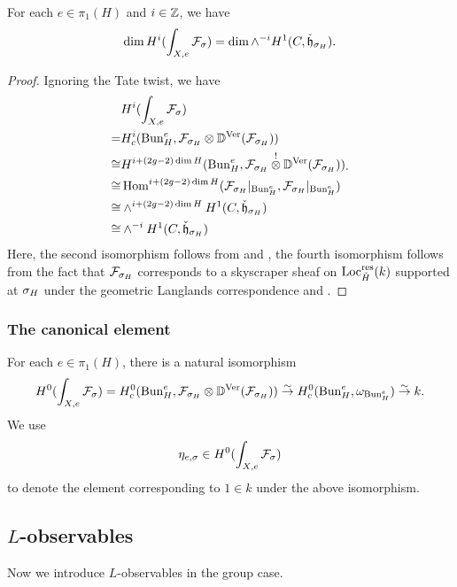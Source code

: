 \documentclass[reqno]{amsart}
\numberwithin{equation}{section}
\numberwithin{equation}{section}
\begin{document}
\begin{prop}\label{prop:dim}
    For each $e\in \pi_1(H)$ and $i\in \mathbb{Z}$, we have \[\dim H^{i}(\int_{X,e}\mathcal{F}_{\sigma})=\dim  \wedge^{-i}H^1(C,\check{\mathfrak{h}}_{\sigma_H}).\]
\end{prop}

\begin{proof}
    Ignoring the Tate twist, we have \[\begin{split} & H^i(\int_{X,e}\mathcal{F}_{\sigma}) \\ = & H_c^i(\operatorname{Bun}_H^e, \mathcal{F}_{\sigma_H}\otimes\mathbb{D}^{\mathrm{Ver}}(\mathcal{F}_{\sigma_H})) \\ \cong & H^{i+(2g-2)\dim H}(\operatorname{Bun}_H^e, \mathcal{F}_{\sigma_H}\overset{!}{\otimes} {\mathbb{D}}^{\mathrm{Ver}}(\mathcal{F}_{\sigma_H})) \\ \cong & \operatorname{Hom}^{i+(2g-2)\dim H}(\mathcal{F}_{\sigma_H}|_{\operatorname{Bun}_H^e}, \mathcal{F}_{\sigma_H}|_{\operatorname{Bun}_H^e}) \\ \cong & \wedge^{i+(2g-2)\dim H}H^1(C,\check{\mathfrak{h}}_{\sigma_H}) \\ \cong & \wedge^{-i}H^1(C,\check{\mathfrak{h}}_{\sigma_H})  \end{split}.\] Here, the second isomorphism follows from \cite[Theorem\,0.4.5]{gaitsgory2017strange} and \cite[Corollary\,3.3.7]{arinkin2022dualityautomorphicsheavesnilpotent}, the fourth isomorphism follows from the fact that $\mathcal{F}_{\sigma_H}$ corresponds to a skyscraper sheaf on $\mathrm{Loc}_{\check{H}}^{\mathrm{res}}(k)$ supported at $\sigma_H$ under the geometric Langlands correspondence and \cite[Theorem\,0.1.4]{gaitsgory2025geometriclanglandspositivecharacteristic}.
\end{proof}

\subsubsection{The canonical element}
For each $e\in \pi_1(H)$, there is a natural isomorphism \begin{equation}
    H^0(\int_{X,e}\mathcal{F}_{\sigma})=H_c^0(\operatorname{Bun}_H^e, \mathcal{F}_{\sigma_H}\otimes\mathbb{D}^{\mathrm{Ver}}(\mathcal{F}_{\sigma_H}))\stackrel{\sim}{\to} H^0_c(\operatorname{Bun}_H^e, \omega_{\operatorname{Bun}_H^e})\stackrel{\sim}{\to} k
.\end{equation}  We use \begin{equation}\label{eq:canelement}
    \eta_{e,\sigma}\in H^0(\int_{X,e}\mathcal{F}_{\sigma})\end{equation} to denote the element corresponding to $1\in k$ under the above isomorphism.


\subsection{\texorpdfstring{$L$}{L}-observables}
Now we introduce $L$-observables in the group case.
\end{document}
